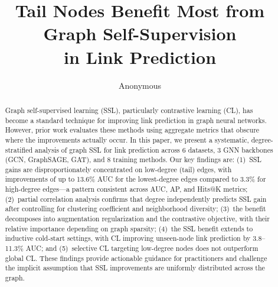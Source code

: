 \documentclass[sigconf,nonacm]{acmart}
\begin{document}
\title{Tail Nodes Benefit Most from Graph Self-Supervision \\ in Link Prediction}

\author{Anonymous}

\begin{abstract}
Graph self-supervised learning (SSL), particularly contrastive learning (CL), has become a standard technique for improving link prediction in graph neural networks. However, prior work evaluates these methods using aggregate metrics that obscure where the improvements actually occur. In this paper, we present a systematic, degree-stratified analysis of graph SSL for link prediction across 6 datasets, 3 GNN backbones (GCN, GraphSAGE, GAT), and 8 training methods. Our key findings are: (1)~SSL gains are disproportionately concentrated on low-degree (tail) edges, with improvements of up to 13.6\% AUC for the lowest-degree edges compared to 3.3\% for high-degree edges---a pattern consistent across AUC, AP, and Hits@K metrics; (2)~partial correlation analysis confirms that degree independently predicts SSL gain after controlling for clustering coefficient and neighborhood diversity; (3)~the benefit decomposes into augmentation regularization and the contrastive objective, with their relative importance depending on graph sparsity; (4)~the SSL benefit extends to inductive cold-start settings, with CL improving unseen-node link prediction by 3.8--11.3\% AUC; and (5)~selective CL targeting low-degree nodes does not outperform global CL. These findings provide actionable guidance for practitioners and challenge the implicit assumption that SSL improvements are uniformly distributed across the graph.
\end{abstract}

\maketitle













\end{document}
